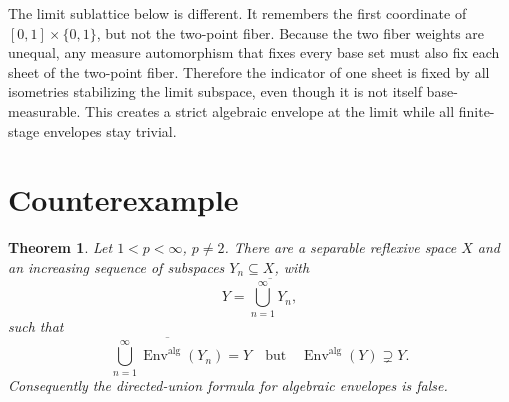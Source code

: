\documentclass[11pt]{article}
\newtheorem{theorem}{Theorem}
\newcommand{\Env}{\operatorname{Env}}
\newcommand{\alg}{\mathrm{alg}}
\begin{document}
The limit sublattice below is different.  It remembers the first coordinate of
\([0,1]\times\{0,1\}\), but not the two-point fiber.  Because the two fiber
weights are unequal, any measure automorphism that fixes every base set must
also fix each sheet of the two-point fiber.  Therefore the indicator of one
sheet is fixed by all isometries stabilizing the limit subspace, even though it
is not itself base-measurable.  This creates a strict algebraic envelope at the
limit while all finite-stage envelopes stay trivial.

\section*{Counterexample}

\begin{theorem}
Let \(1<p<\infty\), \(p\ne 2\).  There are a separable reflexive space
\(X\) and an increasing sequence of subspaces \(Y_n\subseteq X\), with
\[
  Y=\overline{\bigcup_{n=1}^\infty Y_n},
\]
such that
\[
  \overline{\bigcup_{n=1}^\infty \Env^{\alg}(Y_n)}=Y
  \quad\text{but}\quad
  \Env^{\alg}(Y)\supsetneq Y.
\]
Consequently the directed-union formula for algebraic envelopes is false.
\end{theorem}
\end{document}
